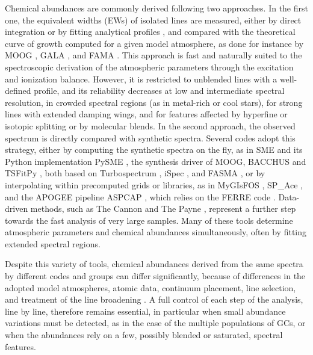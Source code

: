 \documentclass{aa}
\begin{document}
Chemical abundances are commonly derived following two approaches.
In the first one, the equivalent widths (EWs) of isolated lines are
measured, either by direct integration or by fitting analytical
profiles \citep[e.g., with DAOSPEC or ARES;][]{Stetson2008,
Sousa2007, Sousa2015}, and compared with the theoretical curve of
growth computed for a given model atmosphere, as done for instance by
MOOG \citep{Sneden1973}, GALA \citep{Mucciarelli2013}, and FAMA
\citep{Magrini2013}. This approach is fast and naturally suited to the
spectroscopic derivation of the atmospheric parameters through the
excitation and ionization balance. However, it is restricted to
unblended lines with a well-defined profile, and its reliability
decreases at low and intermediate spectral resolution, in crowded
spectral regions (as in metal-rich or cool stars), for strong lines
with extended damping wings, and for features affected by hyperfine
or isotopic splitting or by molecular blends. In the second approach,
the observed spectrum is directly compared with synthetic spectra.
Several codes adopt this strategy, either by computing the synthetic
spectra on the fly, as in SME \citep{Valenti1996, Piskunov2017} and
its Python implementation PySME \citep{Wehrhahn2023}, the
synthesis driver of MOOG, BACCHUS \citep{Masseron2016} and TSFitPy
\citep{Gerber2023}, both based on Turbospectrum
\citep{AlvarezPlez1998, Plez2012}, iSpec \citep{BlancoCuaresma2014,
BlancoCuaresma2019}, and FASMA \citep{Tsantaki2018}, or by
interpolating within precomputed grids or libraries, as in MyGIsFOS
\citep{Sbordone2014}, SP\_Ace \citep{Boeche2016}, and the APOGEE
pipeline ASPCAP \citep{GarciaPerez2016}, which relies on the FERRE
code \citep{AllendePrieto2006}. Data-driven methods, such as The
Cannon \citep{Ness2015} and The Payne \citep{Ting2019}, represent a
further step towards the fast analysis of very large samples. Many of
these tools determine atmospheric parameters and chemical abundances
simultaneously, often by fitting extended spectral regions.

Despite this variety of tools, chemical abundances derived from the
same spectra by different codes and groups can differ significantly,
because of differences in the adopted model atmospheres, atomic data,
continuum placement, line selection, and treatment of the line
broadening \citep{Smiljanic2014, Hinkel2016, Jofre2019}. A full control
of each step of the analysis, line by line, therefore remains
essential, in particular when small abundance variations must be
detected, as in the case of the multiple populations of GCs, or when
the abundances rely on a few, possibly blended or saturated,
spectral features.
\end{document}
